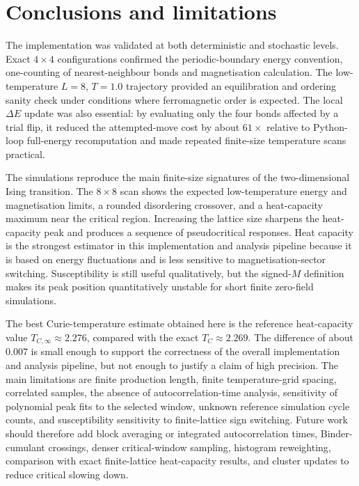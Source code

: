 \documentclass[twoside,twocolumn,9pt]{extarticle}
\begin{document}
\section{Conclusions and limitations}

The implementation was validated at both deterministic and stochastic levels. Exact \(4 \times 4\) configurations confirmed the periodic-boundary energy convention, one-counting of nearest-neighbour bonds and magnetisation calculation. The low-temperature \(L=8\), \(T=1.0\) trajectory provided an equilibration and ordering sanity check under conditions where ferromagnetic order is expected. The local \(\Delta E\) update was also essential: by evaluating only the four bonds affected by a trial flip, it reduced the attempted-move cost by about \(61\times\) relative to Python-loop full-energy recomputation and made repeated finite-size temperature scans practical.

The simulations reproduce the main finite-size signatures of the two-dimensional Ising transition. The \(8 \times 8\) scan shows the expected low-temperature energy and magnetisation limits, a rounded disordering crossover, and a heat-capacity maximum near the critical region. Increasing the lattice size sharpens the heat-capacity peak and produces a sequence of pseudocritical responses. Heat capacity is the strongest estimator in this implementation and analysis pipeline because it is based on energy fluctuations and is less sensitive to magnetisation-sector switching. Susceptibility is still useful qualitatively, but the signed-\(M\) definition makes its peak position quantitatively unstable for short finite zero-field simulations.

The best Curie-temperature estimate obtained here is the reference heat-capacity value \(T_{C,\infty}\approx2.276\), compared with the exact \(T_C\approx2.269\). The difference of about 0.007 is small enough to support the correctness of the overall implementation and analysis pipeline, but not enough to justify a claim of high precision. The main limitations are finite production length, finite temperature-grid spacing, correlated samples, the absence of autocorrelation-time analysis, sensitivity of polynomial peak fits to the selected window, unknown reference simulation cycle counts, and susceptibility sensitivity to finite-lattice sign switching. Future work should therefore add block averaging or integrated autocorrelation times, Binder-cumulant crossings, denser critical-window sampling, histogram reweighting, comparison with exact finite-lattice heat-capacity results, and cluster updates to reduce critical slowing down.
\end{document}

